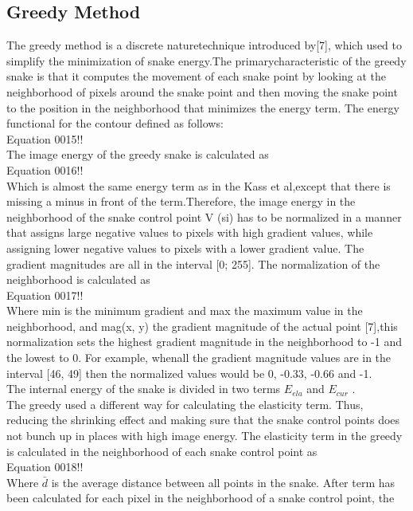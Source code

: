 \subsection{Greedy Method}\label{subsec:greedy-method}
\hspace{1cm}The greedy method is a discrete naturetechnique introduced by[7], which used
to simplify the minimization of snake energy.The primarycharacteristic of the
greedy snake is that it computes the movement of each snake point by looking
at the neighborhood of pixels around the snake point and then moving the
snake point to the position in the neighborhood that minimizes the energy
term. The energy functional for the contour defined as follows:\\
Equation 0015!!\\
The image energy of the greedy snake is calculated as\\
Equation 0016!!\\
Which is almost the same energy term as in the Kass et al,except that there is
missing a minus in front of the term.Therefore, the image energy in the
neighborhood of the snake control point V (si) has to be normalized in a
manner that assigns large negative values to pixels with high gradient values,
while assigning lower negative values to pixels with a lower gradient value. The
gradient magnitudes are all in the interval [0; 255]. The normalization of the
neighborhood is calculated as\\
Equation 0017!!\\
Where min is the minimum gradient and max the maximum value in the
neighborhood, and mag(x, y) the gradient magnitude of the actual point [7],this
normalization sets the highest gradient magnitude in the neighborhood to -1
and the lowest to 0. For example, whenall the gradient magnitude values are in
the interval [46, 49] then the normalized values would be 0, -0.33, -0.66 and -1.\\
The internal energy of the snake is divided in two terms $E_{ela}$ and $E_{cur}$ .\\
The greedy used a different way for calculating the elasticity term. Thus,
reducing the shrinking effect and making sure that the snake control points
does not bunch up in places with high image energy. The elasticity term in the
greedy is calculated in the neighborhood of each snake control point as\\
Equation 0018!!\\
Where $\bar{d}$ is the average distance between all points in the snake. After term has
been calculated for each pixel in the neighborhood of a snake control point, the
